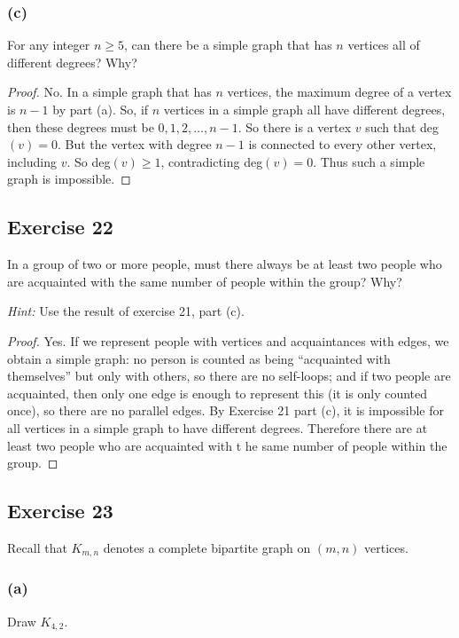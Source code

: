 \documentclass[14pt]{extarticle}
\begin{document}
\subsubsection{(c)}
For any integer $n \geq 5$, can there be a simple graph that has $n$ vertices all of different degrees? Why?

\begin{proof}
No. In a simple graph that has $n$ vertices, the maximum degree of a vertex is $n-1$ by part (a). So, if $n$ vertices in a simple graph all have different degrees, then these degrees must be $0, 1, 2, \ldots, n-1$. So there is a vertex $v$ such that deg$(v) = 0$. But the vertex with degree $n-1$ is connected to every other vertex, including $v$. So deg$(v) \geq 1$, contradicting deg$(v) = 0$. Thus such a simple graph is impossible.
\end{proof}

\subsection{Exercise 22}
In a group of two or more people, must there always be at least two people who are acquainted with the same number of people within the group? Why?

{\it Hint:} Use the result of exercise 21, part (c).

\begin{proof}
Yes. If we represent people with vertices and acquaintances with edges, we obtain a simple graph: no person is counted as being ``acquainted with themselves'' but only with others, so there are no self-loops; and if two people are acquainted, then only one edge is enough to represent this (it is only counted once), so there are no parallel edges.
By Exercise 21 part (c), it is impossible for all vertices in a simple graph to have different degrees. Therefore there are at least two people who are acquainted with t he same number of people within the group.
\end{proof}

\subsection{Exercise 23}
Recall that $K_{m,n}$ denotes a complete bipartite graph on $(m, n)$ vertices.

\subsubsection{(a)}
Draw $K_{4,2}$.
\end{document}
